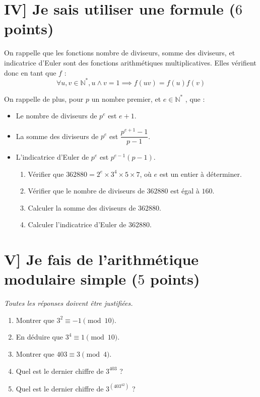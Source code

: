 \documentclass[12pt,a4paper]{article}
\begin{document}
\section*{IV] Je sais utiliser une formule ($6$ points)}
On rappelle que les fonctions nombre de diviseurs, somme des diviseurs, et indicatrice d'Euler sont des fonctions arithmétiques multiplicatives. Elles vérifient donc en tant que $f$ :
 $$\forall u, v \in \mathbb{N}^*, u\land v = 1 \implies f(uv) = f(u)f(v)$$

On rappelle de plus, pour $p$ un nombre premier, et $e\in\mathbb{N}^*$ , que :
\begin{itemize}
\item Le nombre de diviseurs de $p^e$ est $e+1$.
\item La somme des diviseurs de $p^e$ est $\dfrac{p^{e+1}-1}{p-1}$.
\item L'indicatrice d'Euler de $p^e$ est $p^{e-1}(p-1)$.

\begin{enumerate}
\item Vérifier que $\num{362880} = 2^e\times 3^4 \times 5 \times 7$, où $e$ est un entier à déterminer.
\item Vérifier que le nombre de diviseurs de $\num{362880}$ est égal à $160$.
\item Calculer la somme des diviseurs de $\num{362880}$.
\item Calculer l'indicatrice d'Euler de $\num{362880}$.

\end{enumerate}

\end{itemize}

\section*{V] Je fais de l'arithmétique modulaire simple ($5$ points)}
\emph{Toutes les réponses doivent être justifiées.}
\begin{enumerate}
\item Montrer que $3^2 \equiv -1 \pmod {10}$.
\item En déduire que $3^4 \equiv 1 \pmod {10}$.
\item Montrer que $403 \equiv 3 \pmod {4}$.
\item Quel est le dernier chiffre de $3^{403}$ ?
\item Quel est le dernier chiffre de $3^{(403^{42})}$ ?
\end{enumerate}
\end{document}
